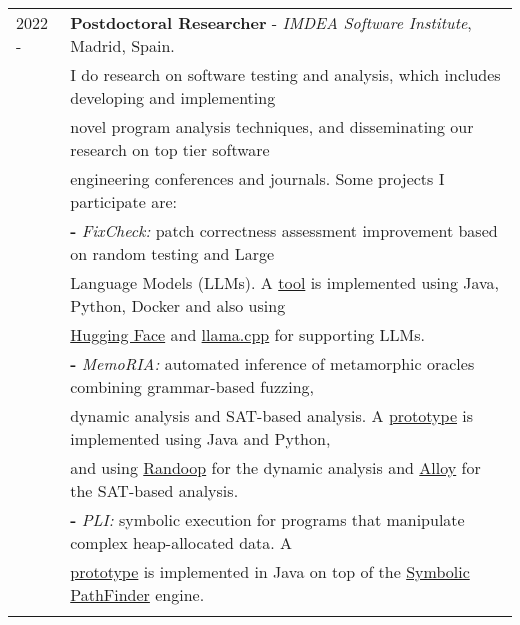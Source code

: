 \documentclass[a4paper,10pt]{article} %
\begin{document}
\begin{longtable}{ll}
\\
2022 - & \textbf{Postdoctoral Researcher} - \textit{IMDEA Software Institute}, Madrid, Spain. \\
& I do research on software testing and analysis, which includes developing and implementing \\ 
& novel program analysis techniques, and disseminating our research on top tier software \\ 
& engineering  conferences and journals. Some projects I participate are: \\ 
& \textbf{-} \textit{FixCheck:} patch correctness assessment improvement based on random testing and Large \\
& Language Models (LLMs). A \href{https://github.com/facumolina/fixcheck}{tool} is implemented using Java, Python, Docker and also using \\
& \href{https://huggingface.co/}{Hugging Face} and \href{https://github.com/ggerganov/llama.cpp}{llama.cpp} for supporting LLMs. \\
& \textbf{-} \textit{MemoRIA:} automated inference of metamorphic oracles combining grammar-based fuzzing, \\
& dynamic analysis and SAT-based analysis. A \href{https://zenodo.org/records/10683011}{prototype} is implemented using Java and Python, \\ 
& and using \href{https://randoop.github.io/randoop/}{Randoop} for the dynamic analysis and \href{https://alloytools.org/}{Alloy} for the SAT-based analysis. \\
& \textbf{-} \textit{PLI:} symbolic execution for programs that manipulate complex heap-allocated data. A \\ 
& \href{https://github.com/JuanmaCopia/spf-pli}{prototype} is implemented in Java on top of the \href{https://github.com/SymbolicPathFinder/jpf-symbc}{Symbolic PathFinder} engine. \\ & \\


\end{longtable}
\end{document}
